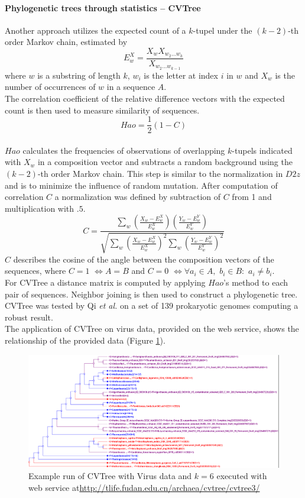 \documentclass[twocolumn]{bmcart}%
\begin{document}
\paragraph*{Phylogenetic trees through statistics -- CVTree}
Another approach utilizes the expected count of a $k$-tupel under the $(k-2)$-th order Markov chain, estimated by 
$$E_w^X=\frac{X_wX_{w_2\dots w_k}}{X_{w_2\dots w_{k-1}}}$$
where $w$ is a substring of length $k$, $w_i$ is the letter at index $i$ in $w$ and $X_w$ is the number of occurrences of $w$ in a sequence $A$.\\
The correlation coefficient of the relative difference vectors with the expected count is then used to measure similarity of sequences\cite{doi:10.1093/bib/bbt067}.
$$Hao=\frac{1}{2}\left(1-C\right)$$
\\
$Hao$ calculates the frequencies of observations of overlapping $k$-tupels indicated with $X_w$ in a composition vector and subtracts a random background using the $(k-2)$-th order Markov chain. This step is similar to the normalization in $D2z$ and is to minimize the influence of random mutation. After computation of correlation $C$ a normalization was defined by subtraction of $C$ from 1 and multiplication with $.5$.
$$C=\frac{\sum_w\left(\frac{X_w-E_w^X}{E_w^X}\right)\left(\frac{Y_w-E_w^Y}{E_w^Y}\right)}{\sqrt{\sum_w\left(\frac{X_w-E_w^X}{E_w^X}\right)^2\sum_w\left(\frac{Y_w-E_w^Y}{E_w^Y}\right)^2}}$$
$C$ describes the cosine of the angle between the composition vectors of the sequences, where $C=1$ $\Leftrightarrow A=B$ and $C=0$ $\Leftrightarrow \forall a_i \in A,$ $b_i \in B:$ $a_i \neq b_i$. \\
For CVTree a distance matrix is computed by applying $Hao$'s method to each pair of sequences. Neighbor joining is then used to construct a phylogenetic tree.\\
CVTree was tested by Qi \textit{et al.} on a set of 139 prokaryotic genomes computing a robust result\cite{qi2004cvtree}. \\
The application of CVTree on virus data, provided on the web service, shows the relationship of the provided data (Figure \ref{img:cvtree}).
\begin{figure}
	\centering
	\includegraphics[width=.99\textwidth]{bilder/CVTree.png}
	\caption{Example run of CVTree with Virus data and $k=6$ executed with web service at\newline \url{http://tlife.fudan.edu.cn/archaea/cvtree/cvtree3/} \cite{qi2004whole,zuo2015cvtree3}}
	\label{img:cvtree}
\end{figure}%
\end{document}
